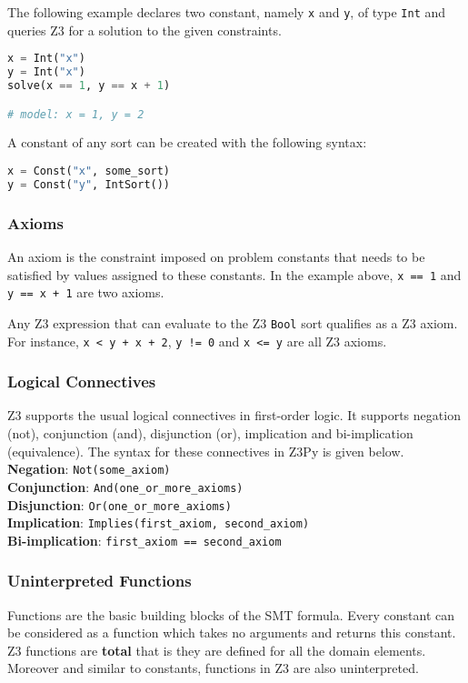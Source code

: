 The following example declares two constant, namely \lstinline|x| and \lstinline|y|, of type \lstinline|Int| and queries Z3 for a solution to the given constraints.

\begin{lstlisting}[language=python]
x = Int("x")
y = Int("x")
solve(x == 1, y == x + 1)

# model: x = 1, y = 2
\end{lstlisting}

A constant of any sort can be created with the following syntax:

\begin{lstlisting}[language=python]
x = Const("x", some_sort)
y = Const("y", IntSort())
\end{lstlisting}

\subsubsection{Axioms}
An axiom is the constraint imposed on problem constants that needs to be satisfied by values assigned to these constants. In the example above, \lstinline|x == 1| and \lstinline|y == x + 1| are two axioms.

Any Z3 expression that can evaluate to the Z3 \lstinline|Bool| sort qualifies as a Z3 axiom. For instance, \lstinline|x < y + x + 2|, \lstinline|y != 0| and \lstinline|x <= y| are all Z3 axioms.


\subsubsection{Logical Connectives}
Z3 supports the usual logical connectives in first-order logic. It supports negation (not), conjunction (and), disjunction (or), implication and bi-implication (equivalence). The syntax for these connectives in Z3Py is given below.\\
\textbf{Negation}: \lstinline|Not(some_axiom)|\\
\textbf{Conjunction}: \lstinline|And(one_or_more_axioms)|\\
\textbf{Disjunction}: \lstinline|Or(one_or_more_axioms)|\\
\textbf{Implication}: \lstinline|Implies(first_axiom, second_axiom)|\\
\textbf{Bi-implication}: \lstinline|first_axiom == second_axiom|\\


\subsubsection{Uninterpreted Functions}
Functions are the basic building blocks of the SMT formula. Every constant can be considered as a function which takes no arguments and returns this constant.
Z3 functions are \textbf{total} that is they are defined for all the domain elements. Moreover and similar to constants, functions in Z3 are also uninterpreted.

